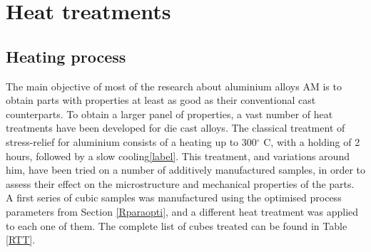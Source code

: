 \section{Heat treatments}


\subsection{Heating process}

The main objective of most of the research about aluminium alloys AM is to obtain parts with properties at least as good as their conventional cast counterparts. To obtain a larger panel of properties, a vast number of heat treatments have been developed for die cast alloys. The classical treatment of stress-relief for aluminium consists of a heating up to 300$^\circ$ C, with a holding of 2 hours, followed by a slow cooling\ref{label}. This treatment, and variations around him, have been tried on a number of additively manufactured samples, in order to assess their effect on the microstructure and mechanical properties of the parts.\\

A first series of cubic samples was manufactured using the optimised process parameters from Section \ref{Rparaopti}, and a different heat treatment was applied to each one of them. The complete list of cubes treated can be found in Table \ref{RTT}.

\begin{center}
\begin{table}[ht]
\noindent{} 
\caption[List of the heat-treated specimens from batch X200-180220]{List of the heat-treated specimens from batch X200-180220}
\label{tab:RTT}
\end{table}
\end{center}


